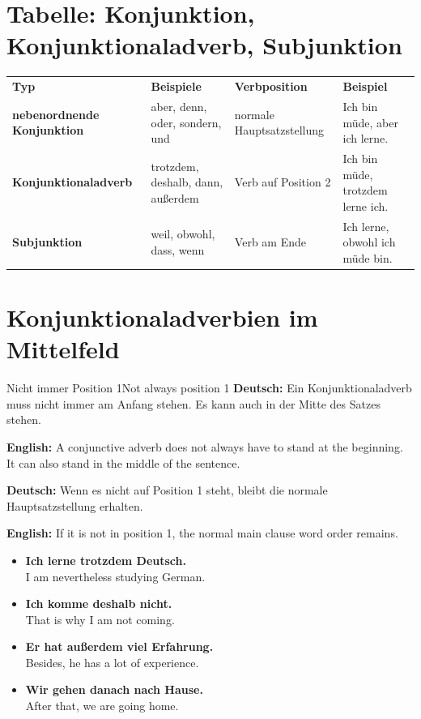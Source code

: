 \documentclass[a4paper,11pt]{article}
\newcommand{\GermanText}[1]{\textbf{Deutsch: }#1\par}
\newcommand{\EnglishText}[1]{{\small\color{SoftGray}\textbf{English: }#1\par}}
\newcommand{\ExampleItem}[2]{\item \textbf{#1}\\{\small\color{SoftGray}#2}}
\begin{document}
    
    \section{Tabelle: Konjunktion, Konjunktionaladverb, Subjunktion}
        
        \begin{tabular}{>{\bfseries}p{3.2cm} p{3.6cm} p{3.8cm} p{4.2cm}}
            \rowcolor{HeaderBlueDark}
            \color{white}\textbf{Typ} & \color{white}\textbf{Beispiele}   & \color{white}\textbf{Verbposition} & \color{white}\textbf{Beispiel} \\
            nebenordnende Konjunktion & aber, denn, oder, sondern, und    & normale Hauptsatzstellung & Ich bin müde, aber ich lerne. \\
            Konjunktionaladverb       & trotzdem, deshalb, dann, außerdem & Verb auf Position 2                & Ich bin müde, trotzdem lerne ich. \\
            Subjunktion               & weil, obwohl, dass, wenn          & Verb am Ende                       & Ich lerne, obwohl ich müde bin.   \\
        \end{tabular}
    
    
    \section{Konjunktionaladverbien im Mittelfeld}
        
        \begin{grammarentry}{Nicht immer Position 1}{Not always position 1}
            \GermanText{Ein Konjunktionaladverb muss nicht immer am Anfang stehen. Es kann auch in der Mitte des Satzes stehen.}
            \EnglishText{A conjunctive adverb does not always have to stand at the beginning. It can also stand in the middle of the sentence.}
            
            \GermanText{Wenn es nicht auf Position 1 steht, bleibt die normale Hauptsatzstellung erhalten.}
            \EnglishText{If it is not in position 1, the normal main clause word order remains.}
            
            \begin{exbox}
                \begin{itemize}
                    \ExampleItem{Ich lerne trotzdem Deutsch.}{I am nevertheless studying German.}
                    \ExampleItem{Ich komme deshalb nicht.}{That is why I am not coming.}
                    \ExampleItem{Er hat außerdem viel Erfahrung.}{Besides, he has a lot of experience.}
                    \ExampleItem{Wir gehen danach nach Hause.}{After that, we are going home.}
                \end{itemize}
            \end{exbox}
        \end{grammarentry}
    
\end{document}
